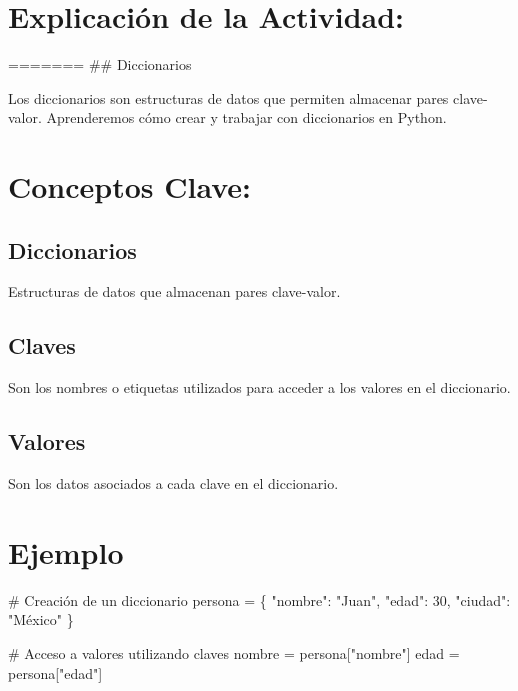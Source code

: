 \documentclass[
  a4paper,
  onepage,
  openany]{scrreprt}
\newenvironment{Shaded}{\begin{snugshade}}{\end{snugshade}}
\newcommand{\CommentTok}[1]{\textcolor[rgb]{0.37,0.37,0.37}{#1}}
\newcommand{\DecValTok}[1]{\textcolor[rgb]{0.68,0.00,0.00}{#1}}
\newcommand{\NormalTok}[1]{\textcolor[rgb]{0.00,0.23,0.31}{#1}}
\newcommand{\OperatorTok}[1]{\textcolor[rgb]{0.37,0.37,0.37}{#1}}
\newcommand{\StringTok}[1]{\textcolor[rgb]{0.13,0.47,0.30}{#1}}
\begin{document}
\hypertarget{explicaciuxf3n-de-la-actividad-22}{%
\section{Explicación de la
Actividad:}\label{explicaciuxf3n-de-la-actividad-22}}

======= \#\# Diccionarios

Los diccionarios son estructuras de datos que permiten almacenar pares
clave-valor. Aprenderemos cómo crear y trabajar con diccionarios en
Python.

\hypertarget{conceptos-clave-25}{%
\section{Conceptos Clave:}\label{conceptos-clave-25}}

\hypertarget{diccionarios-2}{%
\subsection{Diccionarios}\label{diccionarios-2}}

Estructuras de datos que almacenan pares clave-valor.

\hypertarget{claves-1}{%
\subsection{Claves}\label{claves-1}}

Son los nombres o etiquetas utilizados para acceder a los valores en el
diccionario.

\hypertarget{valores-1}{%
\subsection{Valores}\label{valores-1}}

Son los datos asociados a cada clave en el diccionario.

\hypertarget{ejemplo-25}{%
\section{Ejemplo}\label{ejemplo-25}}

\begin{Shaded}
\begin{Highlighting}[]
\CommentTok{\# Creación de un diccionario}
\NormalTok{persona }\OperatorTok{=}\NormalTok{ \{}
    \StringTok{"nombre"}\NormalTok{: }\StringTok{"Juan"}\NormalTok{,}
    \StringTok{"edad"}\NormalTok{: }\DecValTok{30}\NormalTok{,}
    \StringTok{"ciudad"}\NormalTok{: }\StringTok{"México"}
\NormalTok{\}}

\CommentTok{\# Acceso a valores utilizando claves}
\NormalTok{nombre }\OperatorTok{=}\NormalTok{ persona[}\StringTok{"nombre"}\NormalTok{]}
\NormalTok{edad }\OperatorTok{=}\NormalTok{ persona[}\StringTok{"edad"}\NormalTok{]}
\end{Highlighting}
\end{Shaded}
\end{document}
